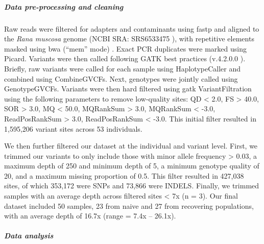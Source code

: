 \documentclass[
  letterpaper,
  DIV=11,
  numbers=noendperiod]{scrartcl}
\let\oldsubparagraph\subparagraph
\renewcommand{\subparagraph}[1]{\oldsubparagraph{#1}\mbox{}}
\begin{document}
\hypertarget{data-pre-processing-and-cleaning}{%
\subparagraph{Data pre-processing and
cleaning}\label{data-pre-processing-and-cleaning}}

Raw reads were filtered for adapters and contaminants using fastp
\citep{chen2018} and aligned to the \emph{Rana muscosa} genome (NCBI
SRA: SRS6533475 \citep{hon2020}), with repetitive elements masked using
bwa (``mem'' mode) \citep{li2013}. Exact PCR duplicates were marked
using Picard. Variants were then called following GATK best practices
(v.4.2.0.0 \citep{van2020}). Briefly, raw variants were called for each
sample using HaplotypeCaller and combined using CombineGVCFs. Next,
genotypes were jointly called using GenotypeGVCFs. Variants were then
hard filtered using gatk VariantFiltration using the following
parameters to remove low-quality sites: QD \textless{} 2.0, FS
\textgreater{} 40.0, SOR \textgreater{} 3.0, MQ \textless{} 50.0,
MQRankSum \textgreater{} 3.0, MQRankSum \textless{} -3.0, ReadPosRankSum
\textgreater{} 3.0, ReadPosRankSum \textless{} -3.0. This initial filter
resulted in 1,595,206 variant sites across 53 individuals.

We then further filtered our dataset at the individual and variant
level. First, we trimmed our variants to only include those with minor
allele frequency \textgreater{} 0.03, a maximum depth of 250 and minimum
depth of 5, a minimum genotype quality of 20, and a maximum missing
proportion of 0.5. This filter resulted in 427,038 sites, of which
353,172 were SNPs and 73,866 were INDELS. Finally, we trimmed samples
with an average depth across filtered sites \textless{} 7x (n = 3). Our
final dataset included 50 samples, 23 from naive and 27 from recovering
populations, with an average depth of 16.7x (range = 7.4x -- 26.1x).

\hypertarget{data-analysis}{%
\subparagraph{Data analysis}\label{data-analysis}}
\end{document}
